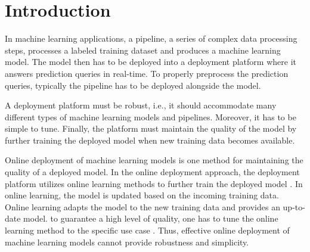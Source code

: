 \section{Introduction} \label{introduction}
In machine learning applications, a pipeline, a series of complex data processing steps, processes a labeled training dataset and produces a machine learning model.
The model then has to be deployed into a deployment platform where it answers prediction queries in real-time.
To properly preprocess the prediction queries, typically the pipeline has to be deployed alongside the model.

A deployment platform must be robust, i.e., it should accommodate many different types of machine learning models and pipelines.
Moreover, it has to be simple to tune.
Finally, the platform must maintain the quality of the model by further training the deployed model when new training data becomes available.

Online deployment of machine learning models is one method for maintaining the quality of a deployed model.
In the online deployment approach, the deployment platform utilizes online learning methods to further train the deployed model \cite{duchi2011adaptive}.
In online learning, the model is updated based on the incoming training data.
Online learning adapts the model to the new training data and provides an up-to-date model.
 to guarantee a high level of quality, one has to tune the online learning method to the specific use case \cite{ma2009identifying, macmahan2013}.
Thus, effective online deployment of machine learning models cannot provide robustness and simplicity.


